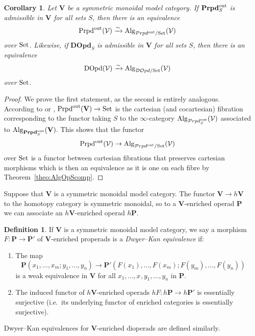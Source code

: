 \documentclass{amsart}
\numberwithin{theorem}{subsection}
\newtheorem{cor}[theorem]{Corollary}
\theoremstyle{definition}
\newtheorem{defn}[theorem]{Definition}
\newcommand{\xV}{\mathcal{V}}
\newcommand{\isoto}{\xrightarrow{\sim}}
\newcommand{\name}[1]{\ensuremath{\text{\textup{#1}}}}
\newcommand{\Set}{\name{Set}}
\newcommand{\Alg}{\name{Alg}}
\newcommand{\calproperad}{\mathcal{P}rpd}
\newcommand{\bfproperad}{\mathbf{Prpd}}
\newcommand{\nmproperad}{\name{Prpd}}
\begin{document}
\begin{cor}\label{cor:OpdWeq}
Let $\mathbf{V}$ be a symmetric monoidal model category.
If $\mathbf{Prpd}^{\name{out}}_{S}$ is admissible in $\mathbf{V}$ for all sets $S$, then there is an equivalence
\[\nmproperad^{\name{out}}(\xV) \isoto
	\Alg_{\calproperad^{\name{out}}/\name{Set}}(\mathbf{\xV})\]
	over $\Set$.
Likewise, if $\mathbf{DOpd}_{S}$ is admissible in $\mathbf{V}$ for all sets $S$, then there is an equivalence
\[\name{DOpd}(\xV) \isoto
	\Alg_{\mathcal{DO}pd/\name{Set}}(\mathbf{\xV})\]
	over $\Set$.
\end{cor}
\begin{proof}
We prove the first statement, as the second is entirely analogous.
According to \cite[Corollary 4.22]{enrcomp} or
	\cite[Proposition 2.1.4]{hinloc}, $\nmproperad^{\name{out}}(\mathbf{V}) \to \Set$ is the cartesian (and cocartesian) 
	fibration corresponding to the functor taking $S$ to the $\infty$-category $\Alg_{\calproperad^{\name{out}}_{S}}(\xV)$ associated to $\Alg_{\bfproperad^{\name{out}}_{S}}(\mathbf{V})$.
	This shows that the functor
	\[\nmproperad^{\name{out}}(\xV) \to
	\Alg_{\calproperad^{\name{out}}/\name{Set}}(\xV)\]
	over $\Set$ is a functor between cartesian fibrations that preserves cartesian morphisms which is then an equivalence as it is one on each fibre by Theorem~\ref{theo:AlgOpScomp}.
\end{proof}

Suppose that $\mathbf{V}$ is a symmetric monoidal model category.
The functor $\mathbf{V} \to h\mathbf{V}$ to the homotopy category is symmetric monoidal, so to a $\mathbf{V}$-enriched operad $\mathbf{P}$ we can associate an $h\mathbf{V}$-enriched operad $h\mathbf{P}$.

\begin{defn}\label{def DK equiv}
If $\mathbf{V}$ is a symmetric monoidal model category, we say a morphism $F \colon \mathbf{P} \to \mathbf{P}'$ of $\mathbf{V}$-enriched properads is a \emph{Dwyer--Kan equivalence} if:
	\begin{enumerate}[(1)]
		\item The map 
		\[ \mathbf{P}(x_{1},\ldots,x_{m}; y_1,\ldots, y_n) \to
		\mathbf{P}'(F(x_{1}), \ldots, F(x_{m}); F(y_m),\ldots, F(y_n))\] 
		is a weak equivalence in $\mathbf{V}$ for all $x_{1},\ldots,x_{},y_1,\ldots, y_n$ in $\mathbf{P}$.
		\item  The induced functor of $h\mathbf{V}$-enriched operads $h F \colon h \mathbf{P} \to h\mathbf{P}'$ is essentially surjective (i.e.\ its underlying functor of enriched categories is essentially surjective).
	\end{enumerate}
Dwyer--Kan equivalences for $\mathbf{V}$-enriched dioperads are defined similarly.
\end{defn}
\end{document}
